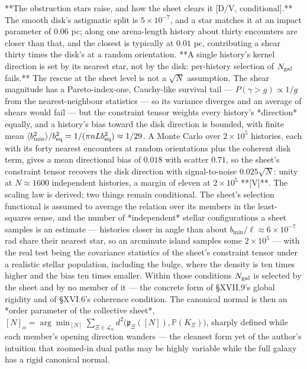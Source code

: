**The obstruction stars raise, and how the sheet clears it [D/V, conditional].** The smooth disk's astigmatic split is $5\times10^{-7}$, and a star matches it at an impact parameter of $0.06$ pc; along one arena-length history about thirty encounters are closer than that, and the closest is typically at $0.01$ pc, contributing a shear thirty times the disk's at a random orientation. **A single history's kernel direction is set by its nearest star, not by the disk: per-history selection of $N_{\rm gal}$ fails.** The rescue at the sheet level is not a $\sqrt N$ assumption. The shear magnitude has a Pareto-index-one, Cauchy-like survival tail — $P(\gamma>g)\propto1/g$ from the nearest-neighbour statistics — so its variance diverges and an average of shears would fail — but the constraint tensor weights every history's *direction* equally, and a history's bias toward the disk direction is bounded, with finite mean $\langle b_{\min}^2\rangle/b_{\rm eq}^2 = 1/(\pi nLb_{\rm eq}^2)\approx1/29$. A Monte Carlo over $2\times10^5$ histories, each with its forty nearest encounters at random orientations plus the coherent disk term, gives a mean directional bias of $0.018$ with scatter $0.71$, so the sheet's constraint tensor recovers the disk direction with signal-to-noise $0.025\sqrt N$: unity at $N\approx1600$ independent histories, a margin of eleven at $2\times10^5$ **[V]**. The scaling law is derived; two things remain conditional. The sheet's selection functional is assumed to average the relation over its members in the least-squares sense, and the number of *independent* stellar configurations a sheet samples is an estimate — histories closer in angle than about $b_{\min}/\ell\approx6\times10^{-7}$ rad share their nearest star, so an arcminute island samples some $2\times10^5$ — with the real test being the covariance statistics of the sheet's constraint tensor under a realistic stellar population, including the bulge, where the density is ten times higher and the bias ten times smaller. Within those conditions $N_{\rm gal}$ is selected by the sheet and by no member of it — the concrete form of §XVII.9's global rigidity and of §XVI.6's coherence condition. The canonical normal is then an *order parameter of the collective sheet*, $[N]_\alpha = \arg\min_{[N]}\sum_{\Xi\in\mathscr L_\alpha}d^2\big(\mathfrak p_\Xi([N]),\mathbb P(K_\Xi)\big)$, sharply defined while each member's opening direction wanders — the cleanest form yet of the author's intuition that zoomed-in dual paths may be highly variable while the full galaxy has a rigid canonical normal.

